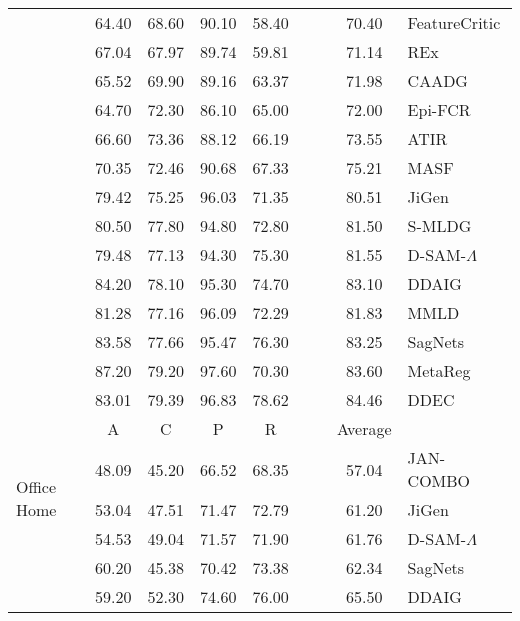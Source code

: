 \documentclass{article}
\begin{document}
\begin{table}
\begin{center}
\begin{small}
{\begin{tabular}{p{1.5cm}cccccccl}
& 64.40 & 68.60 & 90.10 & 58.40 &       &       & 70.40 & FeatureCritic \citep{li2019feature}\\
& 67.04 & 67.97 & 89.74 & 59.81 &       &       & 71.14 & REx \citep{krueger2020out}\\
& 65.52 & 69.90 & 89.16 & 63.37 &       &       & 71.98 & CAADG \citep{rahman2019correlation}\\
& 64.70 & 72.30 & 86.10 & 65.00 &       &       & 72.00 & Epi-FCR \citep{li2019episodic}\\
& 66.60 & 73.36 & 88.12 & 66.19 &       &       & 73.55 & ATIR \citep{albuquerque2019a}\\
& 70.35 & 72.46 & 90.68 & 67.33 &       &       & 75.21 & MASF \citep{dou2019domain}\\
& 79.42 & 75.25 & 96.03 & 71.35 &       &       & 80.51 & JiGen \citep{carlucci2019domain}\\
& 80.50 & 77.80 & 94.80 & 72.80 &       &       & 81.50 & S-MLDG \citep{li2020sequential}\\
& 79.48 & 77.13 & 94.30 & 75.30 &       &       & 81.55 & D-SAM-$\Lambda$ \citep{d2018domain}\\
& 84.20 & 78.10 & 95.30 & 74.70 &       &       & 83.10 & DDAIG \citep{zhou2020deep}\\
& 81.28 & 77.16 & 96.09 & 72.29 &       &       & 81.83 & MMLD \citep{matsuura2019domain}\\
& 83.58 & 77.66 & 95.47 & 76.30 &       &       & 83.25 & SagNets \citep{nam2019reducing}\\
& 87.20 & 79.20 & 97.60 & 70.30 &       &       & 83.60 & MetaReg \citep{balaji2018metareg}\\
& 83.01 & 79.39 & 96.83 & 78.62 &       &       & 84.46 & DDEC \citep{asadi2019towards}\\
\midrule
\multirow{5}{1.5cm}{Office Home}&     A &     C &     P &     R &       &       & Average & \\
& 48.09 & 45.20 & 66.52 & 68.35 &       &       & 57.04 & JAN-COMBO \citep{rahman2019multi}\\
& 53.04 & 47.51 & 71.47 & 72.79 &       &       & 61.20 & JiGen \citep{carlucci2019domain}\\
& 54.53 & 49.04 & 71.57 & 71.90 &       &       & 61.76 & D-SAM-$\Lambda$ \citep{d2018domain}\\
& 60.20 & 45.38 & 70.42 & 73.38 &       &       & 62.34 & SagNets \citep{nam2019reducing}\\
& 59.20 & 52.30 & 74.60 & 76.00 &       &       & 65.50 & DDAIG \citep{zhou2020deep}\\
\bottomrule
\end{tabular}
}
\end{small}
\end{center}
\label{table:sota_review}
\end{table}
\end{document}
